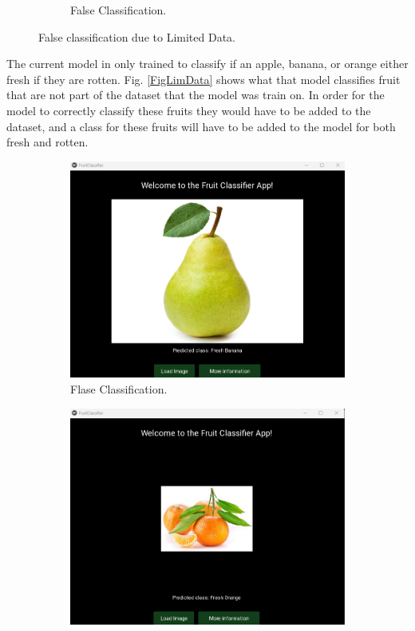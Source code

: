 \documentclass[conference]{IEEEtran}
\begin{document}
\begin{figure}[h]
\begin{subfigure}[b]{0.48\linewidth}
        \caption{False Classification.}
        \label{figFB}
    \end{subfigure}
    \caption{False classification due to Limited Data.}
    \label{FigLimDataV}
\end{figure}

The current model in only trained to classify if an apple, banana, or orange either fresh if they are rotten. Fig. \ref{FigLimData} shows what that model classifies fruit that are not part of the dataset that the model was train on. In order for the model to correctly classify these fruits they would have to be added to the dataset, and a class for these fruits will have to be added to the model for both fresh and rotten.

\begin{figure}[h]
    \centering
    \begin{subfigure}[b]{0.48\linewidth}
        \centering
        \includegraphics[width=\linewidth]{Pear not in dataset.png}
        \caption{Flase Classification.}
        \label{figFA}
    \end{subfigure}
    \hfill
    \begin{subfigure}[b]{0.48\linewidth}
        \centering
        \includegraphics[width=\linewidth]{Tangerine not in dataset.png}

\end{subfigure}
\end{figure}
\end{document}

